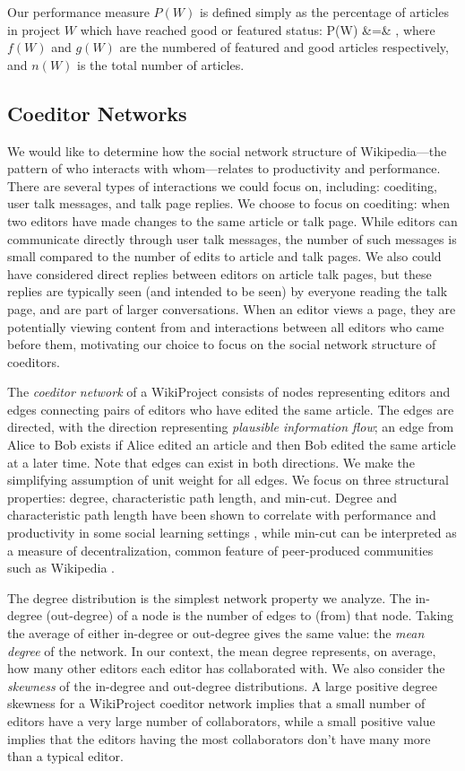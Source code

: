 Our performance measure $P(W)$ is defined simply as
the percentage of articles in project $W$ which have reached
good or featured status:
\beq
P(W) &=& ,
\eeq
where $f(W)$ and $g(W)$ are the numbered of featured and good articles respectively,
and $n(W)$ is the total number of articles.

\subsection{Coeditor Networks}

We would like to determine how the social network structure of
Wikipedia---the pattern of who interacts with whom---relates to
productivity and performance.
There are several types of interactions we could focus on,
including:
coediting, user talk messages, and talk page replies.
We choose to focus on coediting: when two editors have made changes to the
same article or talk page.
While editors can communicate directly through user talk messages,
the number of such messages is small compared to the number of edits to article
and talk pages.
We also could have considered direct replies between editors on article talk
pages, but these replies are typically seen (and intended to be seen)
by everyone reading the talk page,
and are part of larger conversations.
When an editor views a page,
they are potentially viewing content from and interactions
between all editors who came before them,
motivating our choice to focus on the social network structure of
coeditors.

The {\em coeditor network} of a WikiProject consists of nodes representing editors
and edges connecting pairs of editors who have edited the same article.
The edges are directed, with the direction representing
{\em plausible information flow};
an edge from Alice to Bob exists if Alice edited an article and then Bob edited the same article at
a later time. Note that edges can exist in both directions. 
We make the simplifying assumption of unit weight for all edges.
We focus on three structural properties:
degree, characteristic path length, and min-cut.
Degree and characteristic path length have been shown to correlate with
performance and productivity in some social learning settings
\cite{golub_naive_2010,mason_propagation_2008,grim_scientific_2013},
while min-cut can be interpreted as a measure of decentralization,
common feature of peer-produced communities such as Wikipedia
\cite{benkler_wealth_2006}.

The degree distribution is the simplest network property we analyze.
The in-degree (out-degree) of a node is the number of edges to (from) that node.
Taking the average of either in-degree or out-degree gives the same value:
the {\em mean degree} of the network.
In our context, the mean degree represents, on average,
how many other editors each editor has collaborated with.
We also consider the {\em skewness} of the in-degree and out-degree distributions.
A large positive degree skewness for a WikiProject coeditor network
implies that a small number of editors have a very large number of collaborators,
while a small positive value implies that the editors having the most collaborators
don't have many more than a typical editor.

